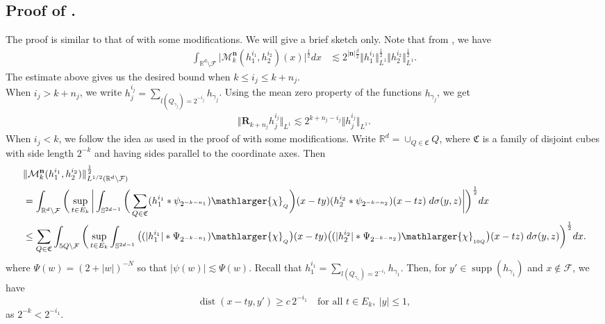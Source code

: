 \documentclass[a4paper,reqno]{amsart}
\numberwithin{equation}{section}
\newcommand{\R}{{\mathbb {R}}}
\newcommand{\supp}{\operatorname{supp}}
\begin{document}
	\subsection*{Proof of .}
	The proof is similar to that of  with some modifications. We will give a brief sketch only. Note that from , we have
	\begin{align*}
		\int_{\mathbb{R}^{d}\setminus \mathcal{F}}\Big|\mathcal{M}^{\mathbf{n}}_k(h^{i_1}_1,h^{i_2}_2)(x)\Big|^{\frac{1}{2}}dx&\lesssim 2^{|\mathbf{n}|\frac{\beta}{2}}\Vert h^{i_1}_{1}\Vert^{\frac{1}{2}}_{L^{1}}\Vert h^{i_2}_{2}\Vert^{\frac{1}{2}}_{L^{1}}.
	\end{align*}
	The estimate above gives us the desired bound when $k\leq i_j\leq k+n_j$. \\
	When $i_j>k+n_j$, we write $h^{i_j}_j=\sum\limits_{l(Q_{\gamma_j})=2^{-i_j}}h_{\gamma_j}$. Using the mean zero property of the functions $h_{\gamma_j}$, we get
	\begin{align}\label{min}
		\Vert \mathbf{R}_{k+n_j}h^{i_j}_{j}\Vert_{L^{1}}\lesssim 2^{k+n_j-i_j}\Vert h^{i_j}_{j}\Vert_{L^{1}}.
	\end{align}
	When $i_j<k$, we follow the idea as used in the proof of  with some modifications.	Write $\R^d=\cup_{Q\in\mathfrak C}Q$, where $\mathfrak{C}$ is a family of disjoint cubes with side length $2^{-k}$ and having sides parallel to the coordinate axes. Then
	\begin{align*}
		&\|\mathcal{M}^{\mathbf{n}}_k(h^{i_1}_1,h^{i_2}_2)\|_{L^{1/2}(\mathbb{R}^{d}\setminus\mathcal{F})}^\frac{1}{2}\\	
		&=\int_{\mathbb{R}^{d}\setminus\mathcal{F}}\bigg(\sup\limits_{t\in E_k}\bigg|\int_{\mathbb{S}^{2d-1}}\bigg(\sum\limits_{Q\in\mathfrak{C}}(h^{i_1}_1*\psi_{2^{-k-n_1}})\mathlarger{\chi}_{_Q}\bigg)(x-ty)( h^{i_2}_2*\psi_{2^{-k-n_2}})(x-tz)\;d\sigma(y,z)\bigg|\bigg)^\frac{1}{2}dx\\
		&\leq\sum_{Q\in\mathfrak{C}}\int_{5Q\setminus\mathcal{F}}\bigg(\sup\limits_{t\in E_k}\int_{\mathbb{S}^{2d-1}}\big((|h^{i_1}_1|*\Psi_{2^{-k-n_1}})\mathlarger{\chi}_{_Q}\big)(x-ty)\big(( |h^{i_2}_2|*\Psi_{2^{-k-n_2}})\mathlarger{\chi}_{_{10Q}}\big)(x-tz)\;d\sigma(y,z)\bigg)^\frac{1}{2}dx.
	\end{align*}
	where $\Psi(w)=(2+|w|)^{-N}$ so that $|\psi(w)|\lesssim\Psi(w)$. 
	Recall that $h^{i_1}_{1}=\sum\limits_{l(Q_{\gamma_1})=2^{-i_1}}h_{\gamma_1}$. Then, for $y'\in \supp(h_{\gamma_1})$ and $x\notin \mathcal{F}$, we have  
	\[\operatorname{dist}(x-ty, y')\geq c\,2^{-i_1}\quad \text{for all }t\in E_k,~ |y|\leq1,\]
	as $2^{-k}<2^{-i_1}$. 
	
\end{document}
